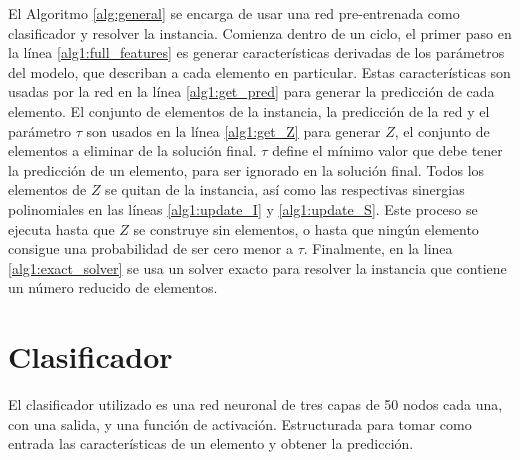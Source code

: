 \documentclass[spanish, a4paper, 12pt, openany,final]{book}
\begin{document}
El Algoritmo \ref{alg:general} se encarga de usar una red pre-entrenada como clasificador y resolver la instancia. Comienza dentro de un ciclo, el primer paso en la línea \ref{alg1:full_features} es generar características derivadas de los parámetros del modelo, que describan a cada elemento en particular. Estas características son usadas por la red en la línea \ref{alg1:get_pred} para generar la predicción de cada elemento. El conjunto de elementos de la instancia, la predicción de la red y el parámetro $\tau$ son usados en la línea \ref{alg1:get_Z} para generar $Z$, el conjunto de elementos a eliminar de la solución final. $\tau$ define el mínimo valor que debe tener la predicción de un elemento, para ser ignorado en la solución final. Todos los elementos de $Z$ se quitan de la instancia, así como las respectivas sinergias polinomiales en las líneas \ref{alg1:update_I} y \ref{alg1:update_S}. Este proceso se ejecuta hasta que $Z$ se construye sin elementos, o hasta que ningún elemento consigue una probabilidad de ser cero menor a $\tau$. Finalmente, en la linea \ref{alg1:exact_solver} se usa un solver exacto para resolver la instancia que contiene un número reducido de elementos.






\newcommand{\algrule}[1][.2pt]{\par\vskip.5\baselineskip\hrule height #1\par\vskip.5\baselineskip}








\section{Clasificador}

El clasificador utilizado es una red neuronal de tres capas de 50 nodos cada una, con una salida, y una función de activación. Estructurada para tomar como entrada las características de un elemento y obtener la predicción.
	
\end{document}
